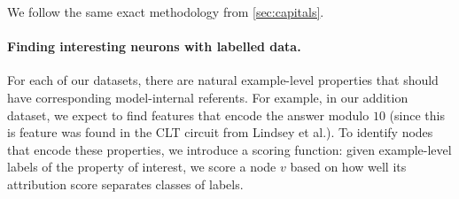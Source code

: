 \documentclass{article}
\theoremstyle{plain}
\theoremstyle{definition}
\theoremstyle{remark}
\begin{document}

We follow the same exact methodology from \cref{sec:capitals}.

\paragraph{Finding interesting neurons with labelled data.}




For each of our datasets, there are natural example-level properties
that should have corresponding model-internal referents. For example, in our addition dataset, we expect to find features
that encode the answer modulo $10$ (since this is feature was found in the CLT circuit from Lindsey et al.). To identify nodes
that encode these properties, we introduce a scoring function: given example-level labels of the property of interest, we score a node $v$ based on
how well its attribution score separates classes of labels.
\end{document}
